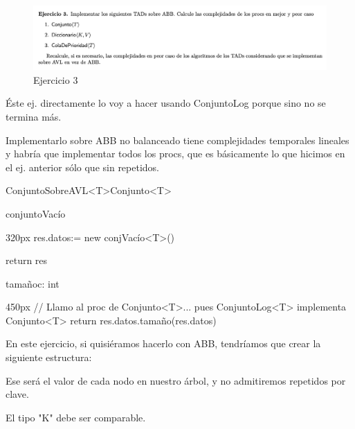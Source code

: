 \documentclass[10pt,a4paper]{article}
\begin{document}
\newpage

\begin{figure}[h]
  \centering
  \includegraphics[width=\textwidth]{images/guia_7_ej_3.png}
  \caption{Ejercicio 3}
  \label{fig:ej_3}
\end{figure}

\par Éste ej. directamente lo voy a hacer usando ConjuntoLog porque sino no se termina más.
\par Implementarlo sobre ABB no balanceado tiene complejidades temporales lineales y habría que implementar todos los procs, que es básicamente lo que hicimos en el ej. anterior sólo que sin repetidos.


\vspace{1em}
\begin{ModuloImplements}{ConjuntoSobreAVL<T>}{Conjunto<T>}
  \begin{Vars}
  \end{Vars}
  \begin{proc}{conjuntoVacío}{}{}
    \begin{ImplementationCode}{320px}
      res.datos:= new conjVacío<T>()

      return res
    \end{ImplementationCode}
  \end{proc}
  \begin{proc}{tamaño}{\In c: }{int}
    \begin{ImplementationCode}{450px}
      // Llamo al proc de Conjunto<T>... pues ConjuntoLog<T> implementa Conjunto<T>
      return res.datos.tamaño(res.datos)
    \end{ImplementationCode}
  \end{proc}
\end{ModuloImplements}
\vspace{1em}
\par
\par En este ejercicio, si quisiéramos hacerlo con ABB, tendríamos que crear la siguiente estructura:
\\
\par Ese será el valor de cada nodo en nuestro árbol, y no admitiremos repetidos por clave.
\par El tipo "K" debe ser comparable.
\\
\justifying
\vspace{0.5em} %
\end{document}
